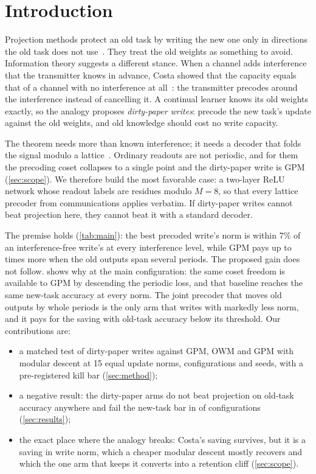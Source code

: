 \section{Introduction}
\label{sec:intro}

Projection methods protect an old task by writing the new one only in directions the old task does not use~\citep{zeng2019owm,farajtabar2020ogd,saha2021gpm}.
They treat the old weights as something to avoid.
Information theory suggests a different stance.
When a channel adds interference that the transmitter knows in advance, Costa showed that the capacity equals that of a channel with no interference at all~\citep{costa1983,gelfand1980}: the transmitter precodes around the interference instead of cancelling it.
A continual learner knows its old weights exactly, so the analogy proposes \emph{dirty-paper writes}: precode the new task's update against the old weights, and old knowledge should cost no write capacity.

The theorem needs more than known interference; it needs a decoder that folds the signal modulo a lattice~\citep{erez2005lattice}.
Ordinary readouts are not periodic, and for them the precoding coset collapses to a single point and the dirty-paper write is GPM (\cref{sec:scope}).
We therefore build the most favorable case: a two-layer ReLU network whose readout labels are residues modulo \(M=8\), so that every lattice precoder from communications applies verbatim.
If dirty-paper writes cannot beat projection here, they cannot beat it with a standard decoder.

The premise holds (\cref{tab:main}): the best precoded write's norm is within 7\% of an interference-free write's at every interference level, while GPM pays up to \gpmcleanmax{} times more when the old outputs span several periods.
The proposed gain does not follow.
 shows why at the main configuration: the same coset freedom is available to GPM by descending the periodic loss, and that baseline reaches the same new-task accuracy at every norm.
The joint precoder that moves old outputs by whole periods is the only arm that writes with markedly less norm, and it pays for the saving with old-task accuracy below its threshold.
Our contributions are:
\begin{itemize}
  \item a matched test of dirty-paper writes against GPM, OWM and GPM with modular descent at 15 equal update norms, \nconfigs{} configurations and \nseeds{} seeds, with a pre-registered kill bar (\cref{sec:method});
  \item a negative result: the dirty-paper arms do not beat projection on old-task accuracy anywhere and fail the new-task bar in \nkilled{} of \nconfigs{} configurations (\cref{sec:results});
  \item the exact place where the analogy breaks: Costa's saving survives, but it is a saving in write norm, which a cheaper modular descent mostly recovers and which the one arm that keeps it converts into a retention cliff (\cref{sec:scope}).
\end{itemize}


